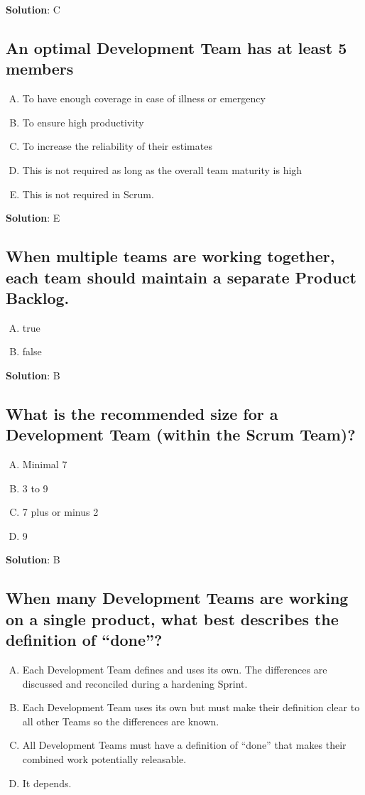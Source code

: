 \textbf{Solution}: C


\subsection{An optimal Development Team has at least 5 members}
\begin{enumerate}[A)]
  \item To have enough coverage in case of illness or emergency
  \item To ensure high productivity
  \item To increase the reliability of their estimates
  \item This is not required as long as the overall team maturity is high
  \item This is not required in Scrum.
\end{enumerate}


\textbf{Solution}: E


\subsection{When multiple teams are working together, each team should maintain a separate Product Backlog.}
\begin{enumerate}[A)]
  \item true
  \item false
\end{enumerate}


\textbf{Solution}: B


\subsection{What is the recommended size for a Development Team (within the Scrum Team)?}
\begin{enumerate}[A)]
  \item Minimal 7
  \item 3 to 9
  \item 7 plus or minus 2
  \item 9
\end{enumerate}


\textbf{Solution}: B


\subsection{When many Development Teams are working on a single product, what best describes the definition of \enquote{done}?}
\begin{enumerate}[A)]
  \item Each Development Team defines and uses its own. The differences are discussed and reconciled during a hardening Sprint.
  \item Each Development Team uses its own but must make their definition clear to all other Teams so the differences are known.
  \item All Development Teams must have a definition of \enquote{done} that makes their combined work potentially releasable.
  \item It depends.
\end{enumerate}


